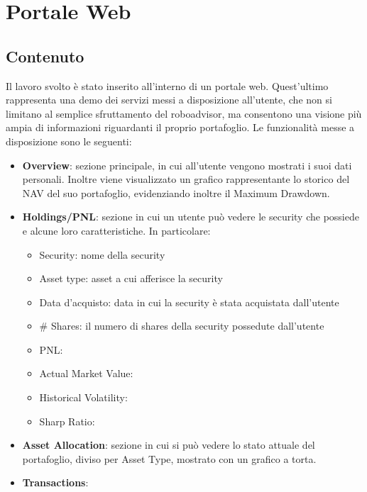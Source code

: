 \section{Portale Web}

\subsection{Contenuto}
Il lavoro svolto è stato inserito all'interno di un portale web. Quest'ultimo rappresenta una demo dei servizi messi a disposizione all'utente, che non si limitano al semplice sfruttamento del roboadvisor, ma consentono una visione più ampia di informazioni riguardanti il proprio \gls{portafoglio}. Le funzionalità messe a disposizione sono le seguenti:
\begin{itemize}
    \item \textbf{Overview}: sezione principale, in cui all'utente vengono mostrati i suoi dati personali. Inoltre viene visualizzato un grafico rappresentante lo storico del \gls{NAV} del suo portafoglio, evidenziando inoltre il \gls{Maximum Drawdown}.
    
    \item \textbf{Holdings/PNL}: sezione in cui un utente può vedere le security che possiede e alcune loro caratteristiche. In particolare:


    \begin{itemize}
        \item Security: nome della security
        \item Asset type: asset a cui afferisce la security
        \item Data d'acquisto: data in cui la security è stata acquistata dall'utente
        \item \# Shares: il numero di shares della security possedute dall'utente
        \item PNL:
        \item Actual Market Value:
        \item Historical Volatility:
        \item Sharp Ratio:
    \end{itemize}

    \item \textbf{Asset Allocation}: sezione in cui si può vedere lo stato attuale del portafoglio, diviso per Asset Type, mostrato con un grafico a torta.

    \item \textbf{Transactions}:


\end{itemize}
